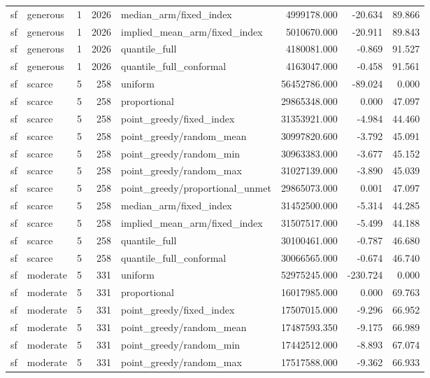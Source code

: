 \begin{tabular}{llrrlrrr}
sf & generous & 1 & 2026 & median\_arm/fixed\_index & 4999178.000 & -20.634 & 89.866 \\
sf & generous & 1 & 2026 & implied\_mean\_arm/fixed\_index & 5010670.000 & -20.911 & 89.843 \\
sf & generous & 1 & 2026 & quantile\_full & 4180081.000 & -0.869 & 91.527 \\
sf & generous & 1 & 2026 & quantile\_full\_conformal & 4163047.000 & -0.458 & 91.561 \\
sf & scarce & 5 & 258 & uniform & 56452786.000 & -89.024 & 0.000 \\
sf & scarce & 5 & 258 & proportional & 29865348.000 & 0.000 & 47.097 \\
sf & scarce & 5 & 258 & point\_greedy/fixed\_index & 31353921.000 & -4.984 & 44.460 \\
sf & scarce & 5 & 258 & point\_greedy/random\_mean & 30997820.600 & -3.792 & 45.091 \\
sf & scarce & 5 & 258 & point\_greedy/random\_min & 30963383.000 & -3.677 & 45.152 \\
sf & scarce & 5 & 258 & point\_greedy/random\_max & 31027139.000 & -3.890 & 45.039 \\
sf & scarce & 5 & 258 & point\_greedy/proportional\_unmet & 29865073.000 & 0.001 & 47.097 \\
sf & scarce & 5 & 258 & median\_arm/fixed\_index & 31452500.000 & -5.314 & 44.285 \\
sf & scarce & 5 & 258 & implied\_mean\_arm/fixed\_index & 31507517.000 & -5.499 & 44.188 \\
sf & scarce & 5 & 258 & quantile\_full & 30100461.000 & -0.787 & 46.680 \\
sf & scarce & 5 & 258 & quantile\_full\_conformal & 30066565.000 & -0.674 & 46.740 \\
sf & moderate & 5 & 331 & uniform & 52975245.000 & -230.724 & 0.000 \\
sf & moderate & 5 & 331 & proportional & 16017985.000 & 0.000 & 69.763 \\
sf & moderate & 5 & 331 & point\_greedy/fixed\_index & 17507015.000 & -9.296 & 66.952 \\
sf & moderate & 5 & 331 & point\_greedy/random\_mean & 17487593.350 & -9.175 & 66.989 \\
sf & moderate & 5 & 331 & point\_greedy/random\_min & 17442512.000 & -8.893 & 67.074 \\
sf & moderate & 5 & 331 & point\_greedy/random\_max & 17517588.000 & -9.362 & 66.933 \\

\end{tabular}
